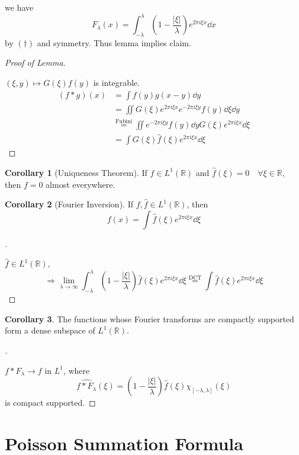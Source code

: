 \documentclass{article}
\theoremstyle{definition}
\newtheorem{cor}{Corollary}
\newenvironment{proofs}[1][\proofname]{%
  \begin{proof}[#1]$ $\par\nobreak\ignorespaces
}{%
  \end{proof}
}
\newcommand{\RR}{\mathbb R}
\newcommand{\Ra}{\Rightarrow}
\begin{document}
we have
\[
	F_\lambda(x) = \int_{- \lambda}^\lambda \left(1 - \frac{|\xi|}{\lambda} \right) e^{2 \pi i \xi x} \dd{x}
\]
by $(\dagger)$ and symmetry.
Thus lemma implies claim.

\begin{proofs}[Proof of Lemma]
	$(\xi, y) \mapsto G(\xi) f(y)$ is integrable.
	\[
		\begin{split}
			(f * g)(x) &= \int f(y) g(x - y) \dd{y}\\
			&= \iint G(\xi) e^{2 \pi i \xi x} e^{-2 \pi i \xi y} f(y) \dd{\xi} \dd{y}\\
			&\stackrel{\text{Fubini}}{=} \iint e^{-2 \pi i \xi y}f(y) \dd{y} G(\xi) e^{2 \pi i \xi x} \dd{\xi}\\
			&= \int G(\xi) \widehat{f}(\xi) e^{2 \pi i \xi x} \dd{\xi}
		\end{split}
	\]
\end{proofs}

\begin{cor}[Uniqueness Theorem]
	If $f \in L^1(\RR)$ and $\widehat{f}(\xi) = 0  \quad \forall \xi \in \RR$, then $f = 0$ almost everywhere.
\end{cor}

\begin{cor}[Fourier Inversion]
	If $f, \widehat{f} \in L^1(\RR)$, then
	\[
		f(x) = \int \widehat{f}(\xi) e^{2 \pi i \xi x} \dd{\xi}
	\]
\end{cor}

\begin{proofs}
	$\widehat{f} \in L^1(\RR)$,
	\[
		\Ra \lim_{\lambda \to \infty} \int_{-\lambda}^\lambda \left( 1 - \frac{|\xi|}{\lambda} \right) \widehat{f}(\xi) e^{2 \pi i \xi x} \dd{\xi} \stackrel{\text{DCT}}{=}\int \widehat{f}(\xi) e^{2 \pi i \xi x} \dd{\xi}
	\]
\end{proofs}

\begin{cor}
	The functions whose Fourier transforms are compactly supported form a dense subspace of $L^1(\RR)$.
\end{cor}

\begin{proofs}
	$f*F_\lambda \to f$ in $L^1$, where 
	\[
		\widehat{f*F_\lambda} (\xi) = \left( 1 - \frac{|\xi|}{\lambda} \right) \widehat{f}(\xi) \chi_{[-\lambda, \lambda]} (\xi)
	\]
	is compact supported.
\end{proofs}

\section{Poisson Summation Formula}
\end{document}
